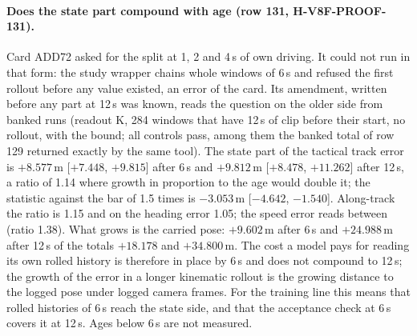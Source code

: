 \paragraph{Does the state part compound with age (row 131, H-V8F-PROOF-131).} Card ADD72 asked for the split at 1, 2 and 4\,s of own driving. It could not run in that form: the study wrapper chains whole windows of 6\,s and refused the first rollout before any value existed, an error of the card. Its amendment, written before any part at 12\,s was known, reads the question on the older side from banked runs (readout K, 284 windows that have 12\,s of clip before their start, no rollout,  with the bound; all controls pass, among them the banked total of row 129 returned exactly by the same tool). The state part of the tactical track error is $+8.577$\,m [$+7.448$, $+9.815$] after 6\,s and $+9.812$\,m [$+8.478$, $+11.262$] after 12\,s, a ratio of 1.14 where growth in proportion to the age would double it; the statistic against the bar of 1.5 times is $-3.053$\,m [$-4.642$, $-1.540$]. Along-track the ratio is 1.15 and on the heading error 1.05; the speed error reads between (ratio 1.38). What grows is the carried pose: $+9.602$\,m after 6\,s and $+24.988$\,m after 12\,s of the totals $+18.178$ and $+34.800$\,m. The cost a model pays for reading its own rolled history is therefore in place by 6\,s and does not compound to 12\,s; the growth of the error in a longer kinematic rollout is the growing distance to the logged pose under logged camera frames. For the training line this means that rolled histories of 6\,s reach the state side, and that the acceptance check at 6\,s covers it at 12\,s. Ages below 6\,s are not measured.

